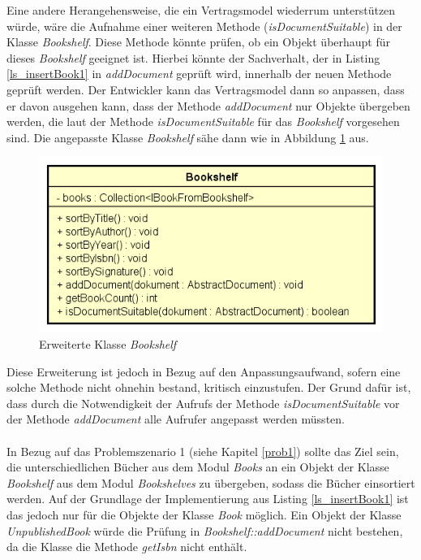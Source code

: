 \documentclass[11pt, 
ngerman,
doublespacing,
chapterinoneline, %
consistentlayout, %
]{scrartcl}
\begin{document}
Eine andere Herangehensweise, die ein Vertragsmodel wiederrum unterstützen würde, wäre die Aufnahme einer weiteren Methode (\emph{isDocumentSuitable}) in der Klasse \emph{Bookshelf}. Diese Methode könnte prüfen, ob ein Objekt überhaupt für dieses \emph{Bookshelf} geeignet ist. Hierbei könnte der Sachverhalt, der in Listing \ref{ls_insertBook1} in \emph{addDocument} geprüft wird, innerhalb der neuen Methode geprüft werden. Der Entwickler kann das Vertragsmodel dann so anpassen, dass er davon ausgehen kann, dass der Methode \emph{addDocument} nur Objekte übergeben werden, die laut der Methode \emph{isDocumentSuitable} für das \emph{Bookshelf} vorgesehen sind. Die angepasste Klasse \emph{Bookshelf} sähe dann wie in Abbildung \ref{cd_erwBookshelf} aus.
\begin{figure}[h]
\centering
\includegraphics[scale=0.5]{pics/cd_erwBookshelf.png}
\caption{Erweiterte Klasse \emph{Bookshelf}}
\label{cd_erwBookshelf}
\end{figure}
Diese Erweiterung ist jedoch in Bezug auf den Anpassungsaufwand, sofern eine solche Methode nicht ohnehin bestand, kritisch einzustufen. Der Grund dafür ist, dass durch die Notwendigkeit der Aufrufs der Methode \emph{isDocumentSuitable} vor der Methode \emph{addDocument} alle Aufrufer angepasst werden müssten.\\\\
In Bezug auf das Problemszenario 1 (siehe Kapitel \ref{prob1}) sollte das Ziel sein, die unterschiedlichen Bücher aus dem Modul \emph{Books} an ein Objekt der Klasse  \emph{Bookshelf} aus dem Modul \emph{Bookshelves} zu übergeben, sodass die Bücher einsortiert werden. Auf der Grundlage der Implementierung aus Listing \ref{ls_insertBook1} ist das jedoch nur für die Objekte der Klasse \emph{Book} möglich. Ein Objekt der Klasse \emph{UnpublishedBook} würde die Prüfung in \emph{Bookshelf::addDocument} nicht bestehen, da die Klasse die Methode \emph{getIsbn} nicht enthält.\\\\
\end{document}

